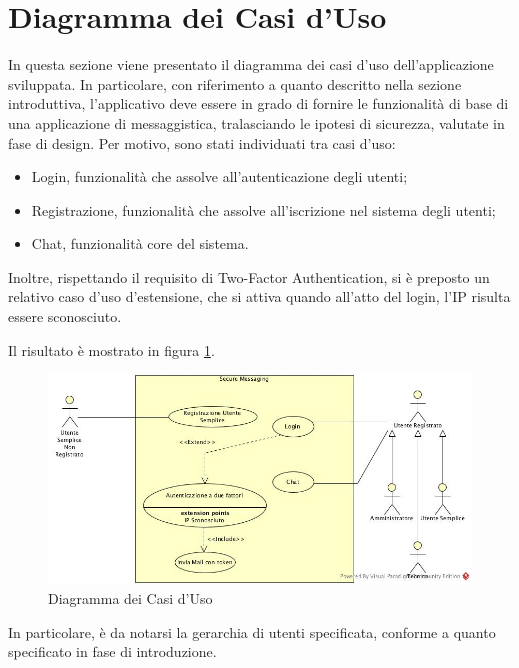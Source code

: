 \section{Diagramma dei Casi d'Uso}

In questa sezione viene presentato il diagramma dei casi d'uso dell'applicazione sviluppata. In particolare, con riferimento a quanto descritto nella sezione introduttiva, l'applicativo deve essere in grado di fornire le funzionalità di base di una applicazione di messaggistica, tralasciando le ipotesi di sicurezza, valutate in fase di design. Per motivo, sono stati individuati tra casi d'uso:
\begin{itemize}
	\item Login, funzionalità che assolve all'autenticazione degli utenti;
	\item Registrazione, funzionalità che assolve all'iscrizione nel sistema degli utenti;
	\item Chat, funzionalità core del sistema.
\end{itemize}

Inoltre, rispettando il requisito di Two-Factor Authentication, si è preposto un relativo caso d'uso d'estensione, che si attiva quando all'atto del login, l'IP risulta essere sconosciuto.

Il risultato è mostrato in figura \ref{gfx:ucdiagram}.

\begin{figure}[!htbp]
	\centering
	\includegraphics[scale = .4]{img/UseCase.jpg}
	\caption{Diagramma dei Casi d'Uso}
	\label{gfx:ucdiagram}
\end{figure}

In particolare, è da notarsi la gerarchia di utenti specificata, conforme a quanto specificato in fase di introduzione.